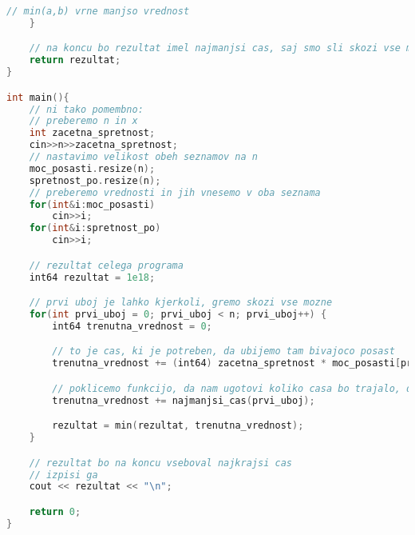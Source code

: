 \begin{lstlisting}[label={lst:code2}, language=C++]
        // min(a,b) vrne manjso vrednost
    }

    // na koncu bo rezultat imel najmanjsi cas, saj smo sli skozi vse moznosti
    return rezultat;
}

int main(){
    // ni tako pomembno:
    // preberemo n in x
    int zacetna_spretnost;
    cin>>n>>zacetna_spretnost;
    // nastavimo velikost obeh seznamov na n
    moc_posasti.resize(n);
    spretnost_po.resize(n);
    // preberemo vrednosti in jih vnesemo v oba seznama
    for(int&i:moc_posasti)
        cin>>i;
    for(int&i:spretnost_po)
        cin>>i;

    // rezultat celega programa
    int64 rezultat = 1e18;

    // prvi uboj je lahko kjerkoli, gremo skozi vse mozne
    for(int prvi_uboj = 0; prvi_uboj < n; prvi_uboj++) {
        int64 trenutna_vrednost = 0;

        // to je cas, ki je potreben, da ubijemo tam bivajoco posast
        trenutna_vrednost += (int64) zacetna_spretnost * moc_posasti[prvi_uboj];

        // poklicemo funkcijo, da nam ugotovi koliko casa bo trajalo, da pridemo do konca
        trenutna_vrednost += najmanjsi_cas(prvi_uboj);

        rezultat = min(rezultat, trenutna_vrednost);
    }

    // rezultat bo na koncu vseboval najkrajsi cas
    // izpisi ga
    cout << rezultat << "\n";

    return 0;
}
\end{lstlisting}
